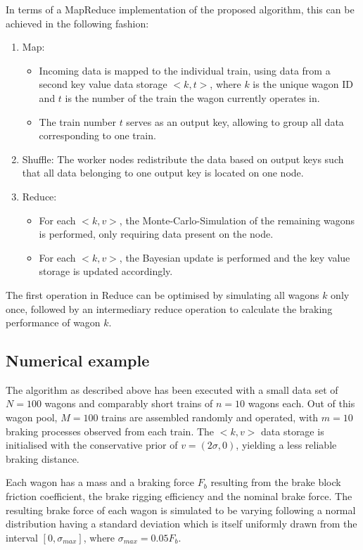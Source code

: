 \documentclass[a4paper, 12pt]{scrartcl}
\begin{document}
In terms of a MapReduce implementation of the proposed algorithm, this can be achieved in the following fashion:
\begin{enumerate}
	\item Map: 
	\begin{itemize}
		\item Incoming data is mapped to the individual train, using data from a second key value data storage $<k, t>$, where $k$ is the unique wagon ID and $t$ is the number of the train the wagon currently operates in.
		\item The train number $t$ serves as an output key, allowing to group all data corresponding to one train.
		\end{itemize}
	\item Shuffle: The worker nodes redistribute the data based on output keys such that all data belonging to one output key is located on one node.
	\item Reduce: 
	\begin{itemize}
		\item For each $<k, v>$, the Monte-Carlo-Simulation of the remaining wagons is performed, only requiring data present on the node.
		\item For each $<k, v>$, the Bayesian update is performed and the key value storage is updated accordingly.
		\end{itemize}
\end{enumerate}
The first operation in Reduce can be optimised by simulating all wagons $k$ only once, followed by an intermediary reduce operation to calculate the braking performance of wagon $k$.

\subsection{Numerical example}
The algorithm as described above has been executed with a small data set of $N = 100$ wagons and comparably short trains of $n = 10$ wagons each. Out of this wagon pool, $M = 100$ trains are assembled randomly and operated, with $m = 10$ braking processes observed from each train. The $<k,v>$ data storage is initialised with the conservative prior of $v = \left(2 \sigma, 0\right)$, yielding a less reliable braking distance.

Each wagon has a mass and a braking force $F_{b}$ resulting from the brake block friction coefficient, the brake rigging efficiency and the nominal brake force. The resulting brake force of each wagon is simulated to be varying following a normal distribution having a standard deviation which is itself uniformly drawn from the interval $\left[0, \sigma_{max}\right]$, where $\sigma_{max} = 0.05 F_{b}$.
\end{document}
